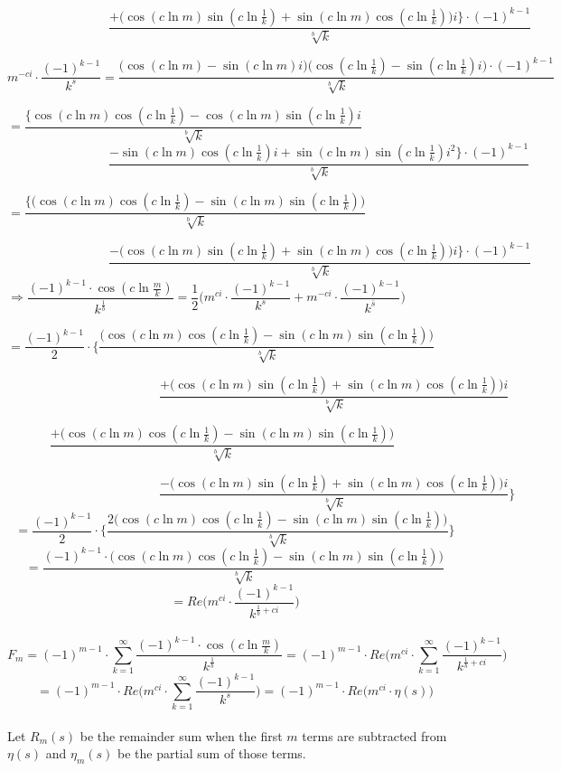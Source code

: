 \documentclass{amsart}
\begin{document}
	\[ \qquad\qquad\qquad\qquad \frac{ {+} \Big( \cos(c \ln m)\sin(c \ln \frac{1}{k}) {+} \sin(c \ln m)\cos(c \ln \frac{1}{k}) \Big)i \Big\} {\cdot} (-1)^{k-1} }{\sqrt[b]{k}}   \]
	
	\[\]
	\[ m^{-ci} {\cdot} \frac{(-1)^{k-1}}{k^s} = \frac{\Big( \cos(c \ln m) {-} \sin(c \ln m) i \Big) \Big(\cos(c \ln \frac{1}{k}) {-} \sin(c \ln \frac{1}{k})i \Big) {\cdot} (-1)^{k-1} }{\sqrt[b]{k}} \]
	
	\[  = \frac{ \Big\{ \cos(c \ln m)\cos(c \ln \frac{1}{k}) {-} \cos(c \ln m)\sin(c \ln \frac{1}{k})i }{\sqrt[b]{k}} \qquad\qquad\qquad\qquad\qquad\qquad\qquad  \]
	\[ \qquad\qquad\qquad\qquad \frac{ {-} \sin(c \ln m)\cos(c \ln \frac{1}{k})i {+} \sin(c \ln m)\sin(c \ln \frac{1}{k})i^2 \Big\} {\cdot} (-1)^{k-1} }{\sqrt[b]{k}}   \]
	
	
	\[ = \frac{ \Big\{ \Big( \cos(c \ln m)\cos(c \ln \frac{1}{k}) - \sin(c \ln m)\sin(c \ln \frac{1}{k}) \Big)  }{\sqrt[b]{k}} \qquad\qquad\qquad\qquad\qquad\qquad\qquad  \]
	
	\[ \qquad\qquad\qquad\qquad \frac{ {-}\Big( \cos(c \ln m)\sin(c \ln \frac{1}{k}) {+} \sin(c \ln m)\cos(c \ln \frac{1}{k}) \Big)i \Big\} {\cdot} (-1)^{k-1} }{\sqrt[b]{k}}   \]
	\[\]
	\[ \Rightarrow \frac{(-1)^{k-1} \cdot \cos(c \ln \frac{m}{k})}{k^{\frac{1}{b}}} = \frac{1}{2} \Big( m^{ci} {\cdot} \frac{(-1)^{k-1}}{k^{s}} + m^{-ci} {\cdot} \frac{(-1)^{k-1}}{k^{\bar{s}}}  \Big) \qquad\qquad\qquad\qquad\qquad\qquad \]
	
	\[ = \frac{(-1)^{k-1}}{2} {\cdot} \Biggl\{ \frac{ \Big( \cos(c \ln m)\cos(c \ln \frac{1}{k}) - \sin(c \ln m)\sin(c \ln \frac{1}{k}) \Big) }{\sqrt[b]{k}} \qquad\qquad\qquad\qquad \]
	
	\[ \qquad\qquad\qquad\qquad\qquad\qquad \frac{ {+} \Big( \cos(c \ln m)\sin(c \ln \frac{1}{k}) {+} \sin(c \ln m)\cos(c \ln \frac{1}{k}) \Big)i  }{\sqrt[b]{k}}   \]
	
	\[ \frac{ {+} \Big( \cos(c \ln m)\cos(c \ln \frac{1}{k}) - \sin(c \ln m)\sin(c \ln \frac{1}{k}) \Big)  }{\sqrt[b]{k}}  \qquad \]
	
	\[ \qquad\qquad\qquad\qquad\qquad\qquad \frac{ {-}\Big( \cos(c \ln m)\sin(c \ln \frac{1}{k}) {+} \sin(c \ln m)\cos(c \ln \frac{1}{k}) \Big)i }{\sqrt[b]{k}} \Biggr\}  \]
	\[\]
	\[ = \frac{(-1)^{k-1}}{2} {\cdot} \Bigg\{ \frac{ 2 \Big( \cos(c \ln m)\cos(c \ln \frac{1}{k}) - \sin(c \ln m)\sin(c \ln \frac{1}{k}) \Big) }{\sqrt[b]{k}} \Biggr\}  \]
	\[\]
	\[ = \frac{ (-1)^{k-1} {\cdot} \Big( \cos(c \ln m)\cos(c \ln \frac{1}{k}) - \sin(c \ln m)\sin(c \ln \frac{1}{k}) \Big) }{\sqrt[b]{k}}      \]
	\[\]
	\[ = Re \Big( m^{ci} \cdot \frac{(-1)^{k-1}}{k^{\frac{1}{b}+ci}} \Big) \]
	\\
	\[ F_m = (-1)^{m-1} \cdot \sum\limits_{k=1}^{\infty} \frac{(-1)^{k-1} {\cdot} \cos(c \ln \frac{m}{k})}{k^{\frac{1}{b}}} = (-1)^{m-1} {\cdot} Re \Big( m^{ci} {\cdot} \sum\limits_{k=1}^{\infty}\frac{(-1)^{k-1}}{k^{\frac{1}{b}+ci}}   \Big) \]
	\[ = (-1)^{m-1} {\cdot} Re \Big( m^{ci} {\cdot} \sum\limits_{k=1}^{\infty}\frac{(-1)^{k-1}}{k^s}  \Big) = (-1)^{m-1} \cdot Re \Big( m^{ci} {\cdot} \eta(s)  \Big)   \]
	\\
	Let $R_m(s)$ be the remainder sum when the first $m$ terms are subtracted from $\eta(s)$ and $\eta_m(s)$ be the partial sum of those terms.
	
\end{document}
